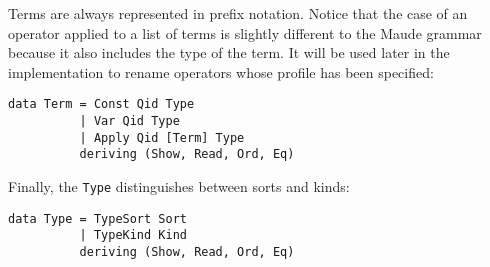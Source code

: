 \begin{itemize}
Terms are always represented in prefix notation. Notice that
the case of an operator applied to a list of terms is slightly different
to the Maude grammar because it also includes the type of the term.
It will be used later in the implementation to rename operators whose
profile has been specified:

{\codesize
\begin{verbatim}
data Term = Const Qid Type
          | Var Qid Type
          | Apply Qid [Term] Type
          deriving (Show, Read, Ord, Eq)
\end{verbatim}
}

Finally, the \verb"Type" distinguishes between sorts and kinds:

{\codesize
\begin{verbatim}
data Type = TypeSort Sort
          | TypeKind Kind
          deriving (Show, Read, Ord, Eq)
\end{verbatim}
}

\end{itemize}
























